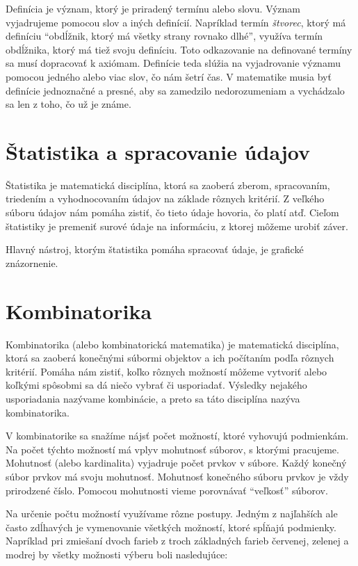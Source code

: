 \documentclass{article}
\begin{document}
Definícia je význam, ktorý je priradený termínu alebo slovu. Význam vyjadrujeme pomocou slov a iných definícií. Napríklad termín \emph{štvorec}, ktorý má definíciu \enquote{obdĺžnik, ktorý má všetky strany rovnako dlhé}, využíva termín obdĺžnika, ktorý má tiež svoju definíciu. Toto odkazovanie na definované termíny sa musí dopracovať k axiómam. Definície teda slúžia na vyjadrovanie významu pomocou jedného alebo viac slov, čo nám šetrí čas. V matematike musia byť definície jednoznačné a presné, aby sa zamedzilo nedorozumeniam a vychádzalo sa len z toho, čo už je známe.

\section{Štatistika a spracovanie údajov}

Štatistika je matematická disciplína, ktorá sa zaoberá zberom, spracovaním, triedením a vyhodnocovaním údajov na základe rôznych kritérií. Z veľkého súboru údajov nám pomáha zistiť, čo tieto údaje hovoria, čo platí atď. Cieľom štatistiky je premeniť surové údaje na informáciu, z ktorej môžeme urobiť záver.

Hlavný nástroj, ktorým štatistika pomáha spracovať údaje, je grafické znázornenie. 

\section{Kombinatorika}

Kombinatorika (alebo kombinatorická matematika) je matematická disciplína, ktorá sa zaoberá konečnými súbormi objektov a ich počítaním podľa rôznych kritérií. Pomáha nám zistiť, koľko rôznych možností môžeme vytvoriť alebo koľkými spôsobmi sa dá niečo vybrať či usporiadať. Výsledky nejakého usporiadania nazývame kombinácie, a preto sa táto disciplína nazýva kombinatorika.

V kombinatorike sa snažíme nájsť počet možností, ktoré vyhovujú podmienkám. Na počet týchto možností má vplyv mohutnosť súborov, s ktorými pracujeme. Mohutnosť (alebo kardinalita) vyjadruje počet prvkov v súbore. Každý konečný súbor prvkov má svoju mohutnosť. Mohutnosť konečného súboru prvkov je vždy prirodzené číslo. Pomocou mohutnosti vieme porovnávať \enquote{veľkosť} súborov.

Na určenie počtu možností využívame rôzne postupy. Jedným z najľahších ale často zdĺhavých je vymenovanie všetkých možností, ktoré spĺňajú podmienky. Napríklad pri zmiešaní dvoch farieb z troch základných farieb červenej, zelenej a modrej by všetky možnosti výberu boli nasledujúce:
\end{document}
